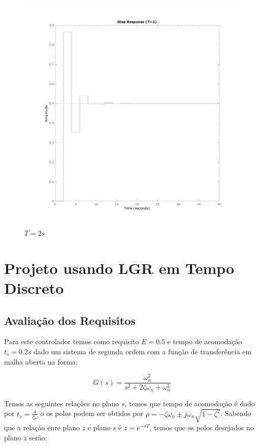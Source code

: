 \documentclass[a4paper,11pt]{article}
\begin{document}
\begin{figure}[H]
    \centering
    \includegraphics[width=0.8\linewidth]{img/exsim3-step-t2000ms.png}
    \caption{ $T=2s$}
\end{figure}


\subsection{}

\section{Projeto usando LGR em Tempo Discreto}

\subsection{Avaliação dos Requisitos}

Para este controlador temos como requisito $E=0.5$ e tempo de acomodação $t_s = 0.2s$ dado um sistema de segunda ordem com a função de transferência em malha aberta na forma:

\begin{equation}
    G(s) = \frac{\omega_n^2}{s^2 + 2\zeta\omega_n + \omega_n^2}
\end{equation}

Temos as seguintes relações no plano $s$, temos que tempo de acomodação é dado por $t_s = \frac{4}{\zeta\omega}$
o os polos podem ser obtidos por $ \rho = -\zeta\omega_n \pm j\omega_n\sqrt{1-\zeta^2}$. Sabendo que a relação enre plano $z$ e plano $s$ é $z=e^{-sT}$, temos que os polos desejados no plano $z$ serâo:
\end{document}
